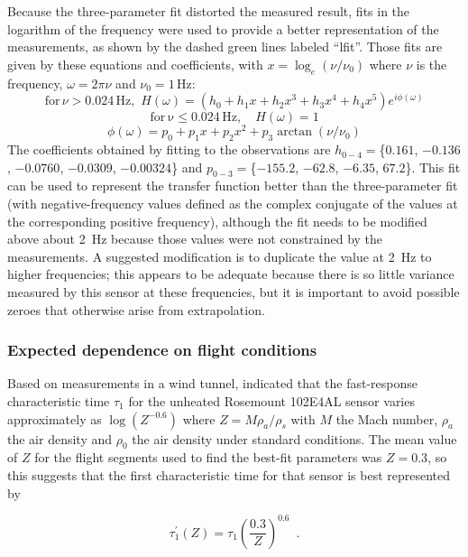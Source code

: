 \documentclass[11pt,twoside,american,12pt,twoside,american]{article}\usepackage[]{graphicx}\usepackage[]{color}
\begin{document}
Because the three-parameter fit distorted the measured result, fits
in the logarithm of the frequency were used to provide a better representation
of the measurements, as shown by the dashed green lines labeled ``lfit''.
Those fits are given by these equations and coefficients, with $x=\log_{e}(\nu/\nu_{0})$
where $\nu$ is the frequency, $\omega=2\pi\nu$ and $\nu_{0}=1\,\mathrm{Hz}$:\\
\begin{equation}
\mathrm{for}\,\nu>0.024\,\mathrm{Hz,\,\,}H(\omega)=(h_{0}+h_{1}x+h_{2}x^{3}+h_{3}x^{4}+h_{4}x^{5})e^{i\phi(\omega)}\label{eq:lfitH}
\end{equation}
\[
\mathrm{for\:\nu\leq0.024\,\mathrm{Hz},\quad}H(\omega)=1
\]
\[
\phi(\omega)=p_{0}+p_{1}x+p_{2}x^{2}+p_{3}\arctan(\nu/\nu_{0})
\]
The coefficients obtained by fitting to the observations are $h_{0-4}=$\{$0.161$,
$-0.136$, $-0.0760$,
$-0.0309$, $-0.00324$\} and $p_{0-3}=$\{$-155.2$,
$-62.8$, $-6.35$, $67.2$\}.
This fit can be used to represent the transfer function better than
the three-parameter fit (with negative-frequency values defined as
the complex conjugate of the values at the corresponding positive
frequency), although the fit needs to be modified above about 2~Hz
because those values were not constrained by the measurements. A suggested
modification is to duplicate the value at 2~Hz to higher frequencies;
this appears to be adequate because there is so little variance measured
by this sensor at these frequencies, but it is important to avoid
possible zeroes that otherwise arise from extrapolation.


\subsubsection{Expected dependence on flight conditions\label{subsec:Expected-dependence-on}}

Based on measurements in a wind tunnel, \citet{GoodrichTR5755} indicated
that the fast-response characteristic time $\tau_{1}$ for the unheated
Rosemount 102E4AL sensor varies approximately as $\log(Z^{-0.6})$
where $Z=M\rho_{a}/\rho_{s}$ with $M$ the Mach number, $\rho_{a}$
the air density and $\rho_{0}$ the air density under standard conditions.
The mean value of $Z$ for the flight segments used to find the best-fit
parameters was $Z=0.3$, so this suggests that the first characteristic
time for that sensor is best represented by

\begin{equation}
\tau_{1}^{\prime}(Z)=\tau_{1}\left(\frac{0.3}{Z}\right)^{0.6}\,\,\,.\label{eq:tau1prime}
\end{equation}
\end{document}
